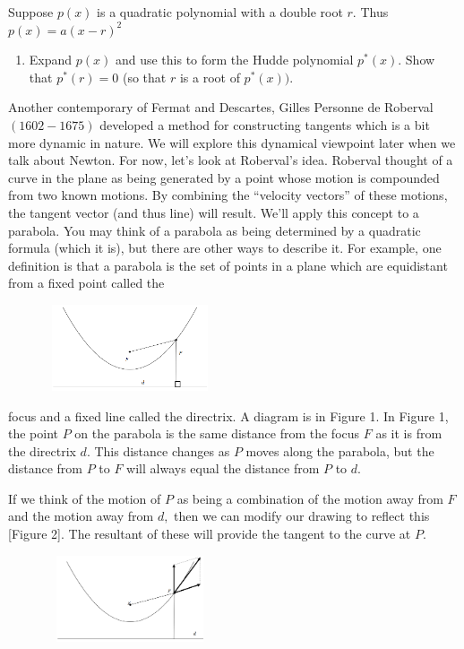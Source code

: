 \begin{embeddedproblem}{}
Suppose $p(x)$ is a quadratic polynomial with a double root $r.$  Thus $p(x)=a(x-r)^2$
\begin{enumerate}
\item Expand $p(x)$ and use this to form the Hudde polynomial $p^*(x).$ 
  Show that $p^*(r)=0$ (so that $r$ is a root of $p^*(x)).$
\end{enumerate}
\end{embeddedproblem}

Another contemporary of Fermat and Descartes, Gilles Personne de
Roberval $(1602-1675)$ developed a method for constructing tangents
which is a bit more dynamic in nature.  We will explore this dynamical
viewpoint later when we talk about Newton.  For now, let's look at
Roberval's idea.  Roberval thought of a curve in the plane as being
generated by a point whose motion is compounded from two known
motions.  By combining the ``velocity vectors'' of these motions, the
tangent vector (and thus line) will result.  We'll apply this concept
to a parabola.  You may think of a parabola as being determined by a
quadratic formula (which it is), but there are other ways to describe
it.  For example, one definition is that a parabola is the set of
points in a plane which are equidistant from a fixed point called the
\begin{figure}
\captionsetup{labelformat=empty}
\centerline{\includegraphics*[height=1in,width=2in]{Figures/GeometricParabola1}}
\label{fig:}
\end{figure}
focus and a fixed line called the directrix.  A diagram is in Figure
1.  In Figure 1, the point $P$ on the parabola is the same distance from
the focus $F$ as it is from the directrix $d.$  This distance changes as $P$
moves along the parabola, but the distance from $P$ to $F$ will always
equal the distance from $P$ to $d.$

If we think of the motion of $P$ as being a combination of the motion
away from $F$ and the motion away from $d,$ then we can modify our
drawing to reflect this [Figure 2].  The resultant of these will
provide the tangent to the curve at $P.$ 
\begin{figure}
\captionsetup{labelformat=empty}
\centerline{\includegraphics*[height=1in,width=2in]{Figures/GeometricParabola2}}
\label{fig:}
\end{figure}


